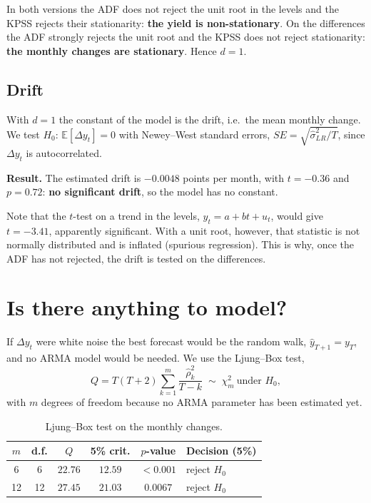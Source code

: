 \documentclass[11pt,a4paper]{article}
\begin{document}
In both versions the ADF does not reject the unit root in the levels and the KPSS rejects their stationarity: \textbf{the yield is non-stationary}. On the differences the ADF strongly rejects the unit root and the KPSS does not reject stationarity: \textbf{the monthly changes are stationary}. Hence $d = 1$.

\subsection{Drift}

With $d = 1$ the constant of the model is the drift, i.e.\ the mean monthly change. We test $H_0$: $\mathbb{E}[\Delta y_t] = 0$ with Newey--West standard errors, $SE = \sqrt{\hat\sigma^2_{LR}/T}$, since $\Delta y_t$ is autocorrelated.

\textbf{Result.} The estimated drift is $-0.0048$ points per month, with $t = -0.36$ and $p = 0.72$: \textbf{no significant drift}, so the model has no constant.

Note that the $t$-test on a trend in the levels, $y_t = a + bt + u_t$, would give $t = -3.41$, apparently significant. With a unit root, however, that statistic is not normally distributed and is inflated (spurious regression). This is why, once the ADF has not rejected, the drift is tested on the differences.

\section{Is there anything to model?}

If $\Delta y_t$ were white noise the best forecast would be the random walk, $\hat y_{T+1} = y_T$, and no ARMA model would be needed. We use the Ljung--Box test,
\begin{equation}
Q = T(T+2)\sum_{k=1}^{m}\frac{\hat\rho_k^2}{T-k} \;\sim\; \chi^2_{m} \ \text{under } H_0,
\end{equation}
with $m$ degrees of freedom because no ARMA parameter has been estimated yet.

\begin{table}[H]
\centering
\begin{tabular}{cccccl}
\toprule
$m$ & d.f. & $Q$ & 5\% crit. & $p$-value & Decision (5\%) \\
\midrule
6 & 6 & $22.76$ & $12.59$ & $< 0.001$ & reject $H_0$ \\
12 & 12 & $27.45$ & $21.03$ & $0.0067$ & reject $H_0$ \\
\bottomrule
\end{tabular}
\caption{Ljung--Box test on the monthly changes.}
\end{table}
\end{document}
